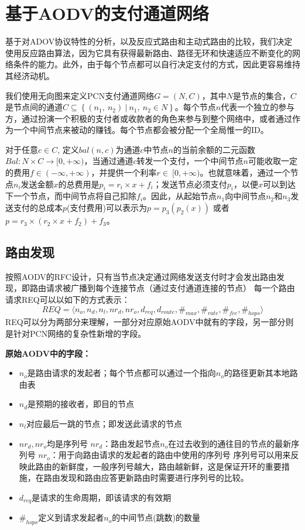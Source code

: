 \documentclass[12pt,a4paper]{article}
\begin{document}
\section{基于AODV的支付通道网络}
基于对ADOV协议特性的分析，以及反应式路由和主动式路由的比较，我们决定使用反应路由算法，因为它具有获得最新路由、路径无环和快速适应不断变化的网络条件的能力。此外，由于每个节点都可以自行决定支付的方式，因此更容易维持其经济动机。

我们使用无向图来定义PCN支付通道网络$G=(N,C)$，其中$N$是节点的集合，$C$是节点间的通道$C\subseteq \left\{(n_1,\ n_2)\ |\ n_1,\ n_2\in N\right\}$。每个节点$n$代表一个独立的参与方，通过扮演一个积极的支付者或收款者的角色来参与到整个网络中，或者通过作为一个中间节点来被动的赚钱。每个节点都会被分配一个全局惟一的ID。

对于任意$c\in C$, 定义$bal(n,c)$为通道$c$中节点$n$的当前余额的二元函数$Bal: N\times C\rightarrow[0,+\infty)$，当通过通道$c$转发一个支付，一个中间节点$n$可能收取一定的费用$f\in(-\infty,+\infty)$，并提供一个利率$r\in\ [0,+\infty)$。也就意味着，通过一个节点$n_i$发送金额$x$的总费用是$p_i=r_i\times x+f_i$；发送节点必须支付$p_i$，以便$x$可以到达下一个节点，而中间节点将自己扣除$f_i$。因此，从起始节点$n_1$向中间节点$n_2$和$n_3$发送支付的总成本$p$(支付费用)可以表示为$p=p_3(p_2(x))$ 或者$p=r_3\times\left(r_2\times x+f_2\right)+f_3$。

\subsection{路由发现}
按照AODV的RFC设计，只有当节点决定通过网络发送支付时才会发出路由发现，即路由请求被广播到每个连接节点（通过支付通道连接的节点）
每一个路由请求REQ可以以如下的方式表示：
\begin{equation}
REQ=\langle n_o, n_d, n_l, {nr}_d, {nr}_o, d_{req},d_{route},\#_{max},\#_{rate},\#_{fee},\#_{hops}\rangle
\end{equation}
REQ可以分为两部分来理解，一部分对应原始AODV中就有的字段，另一部分则是针对PCN网络的复杂性新增的字段。

\textbf{原始AODV中的字段：}
\begin{itemize}
	\item $n_o$是路由请求的发起者；每个节点都可以通过一个指向$n_o$的路径更新其本地路由表
	\item $n_d$是预期的接收者，即目的节点
	\item $n_l$对应最后一跳的节点；即发送此请求的节点
	\item ${nr}_d, {nr}_o$均是序列号
	\iitem ${nr}_d$：路由发起节点$n_o$在过去收到的通往目的节点的最新序列号
	\iitem ${nr}_o$：用于向路由请求的发起者的路由中使用的序列号
	序列号可以用来反映此路由的新鲜度，一般序列号越大，路由越新鲜，这是保证开环的重要措施，在路由发现和路由应答更新路由时需要进行序列号的比较。
	\item $d_{req}$是请求的生命周期，即该请求的有效期
	\item $\#_{hops}$定义到请求发起者$n_o$的中间节点(跳数)的数量
\end{itemize}
\end{document}

